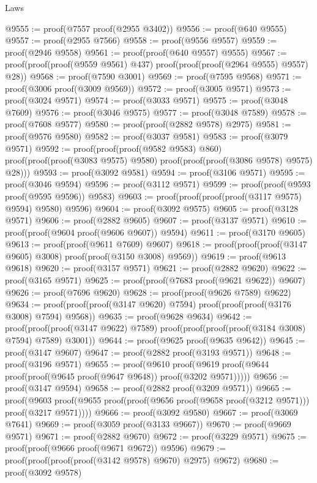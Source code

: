 \begin{lexlean}{Laws}
\begin{coremodule}
@9555 := proof(@7557 proof(@2955 @3402))
@9556 := proof(@640 @9555)
@9557 := proof(@2955 @7566)
@9558 := proof(@9556 @9557)
@9559 := proof(@2946 @9558)
@9561 := proof(proof(@640 @9557) @9555)
@9567 := proof(proof(proof(@9559 @9561) @437) proof(proof(proof(@2964 @9555) @9557) @28))
@9568 := proof(@7590 @3001)
@9569 := proof(@7595 @9568)
@9571 := proof(@3006 proof(@3009 @9569))
@9572 := proof(@3005 @9571)
@9573 := proof(@3024 @9571)
@9574 := proof(@3033 @9571)
@9575 := proof(@3048 @7609)
@9576 := proof(@3046 @9575)
@9577 := proof(@3048 @7589)
@9578 := proof(@7608 @9577)
@9580 := proof(proof(@2882 @9578) @2975)
@9581 := proof(@9576 @9580)
@9582 := proof(@3037 @9581)
@9583 := proof(@3079 @9571)
@9592 := proof(proof(proof(@9582 @9583) @860)
      proof(proof(proof(@3083 @9575) @9580) proof(proof(proof(@3086 @9578) @9575) @28)))
@9593 := proof(@3092 @9581)
@9594 := proof(@3106 @9571)
@9595 := proof(@3046 @9594)
@9596 := proof(@3112 @9571)
@9599 := proof(proof(@9593 proof(@9595 @9596)) @9583)
@9603 := proof(proof(proof(proof(@3117 @9575) @9594) @9580) @9596)
@9604 := proof(@3092 @9575)
@9605 := proof(@3128 @9571)
@9606 := proof(@2882 @9605)
@9607 := proof(@3137 @9571)
@9610 := proof(proof(@9604 proof(@9606 @9607)) @9594)
@9611 := proof(@3170 @9605)
@9613 := proof(proof(@9611 @7609) @9607)
@9618 := proof(proof(proof(@3147 @9605) @3008) proof(proof(@3150 @3008) @9569))
@9619 := proof(@9613 @9618)
@9620 := proof(@3157 @9571)
@9621 := proof(@2882 @9620)
@9622 := proof(@3165 @9571)
@9625 := proof(proof(@7683 proof(@9621 @9622)) @9607)
@9626 := proof(@7696 @9620)
@9628 := proof(proof(@9626 @7589) @9622)
@9634 := proof(proof(proof(@3147 @9620) @7594) proof(proof(proof(@3176 @3008) @7594) @9568))
@9635 := proof(@9628 @9634)
@9642 := proof(proof(proof(@3147 @9622) @7589)
      proof(proof(proof(proof(@3184 @3008) @7594) @7589) @3001))
@9644 := proof(@9625 proof(@9635 @9642))
@9645 := proof(@3147 @9607)
@9647 := proof(@2882 proof(@3193 @9571))
@9648 := proof(@3196 @9571)
@9655 := proof(@9610
      proof(@9619 proof(@9644 proof(proof(@9645 proof(@9647 @9648)) proof(@3202 @9571)))))
@9656 := proof(@3147 @9594)
@9658 := proof(@2882 proof(@3209 @9571))
@9665 := proof(@9603
      proof(@9655 proof(proof(@9656 proof(@9658 proof(@3212 @9571))) proof(@3217 @9571))))
@9666 := proof(@3092 @9580)
@9667 := proof(@3069 @7641)
@9669 := proof(@3059 proof(@3133 @9667))
@9670 := proof(@9669 @9571)
@9671 := proof(@2882 @9670)
@9672 := proof(@3229 @9571)
@9675 := proof(proof(@9666 proof(@9671 @9672)) @9596)
@9679 := proof(proof(proof(proof(@3142 @9578) @9670) @2975) @9672)
@9680 := proof(@3092 @9578)

\end{coremodule}
\end{lexlean}
